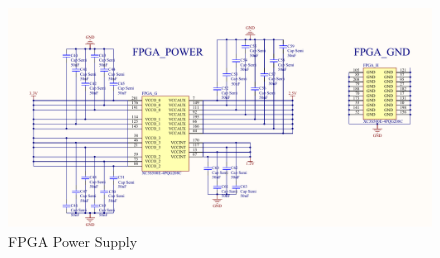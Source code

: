 \begin{figure}[h]
  \centering
  \includegraphics[width=\textwidth]{fig/pcb/schematics/pcbschematic_fpgapower.pdf}
  \caption{FPGA Power Supply}
  \label{fig:schematic-pcb-fpgapower}
\end{figure}
